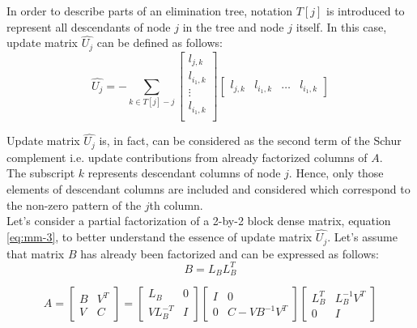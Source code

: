 In order to describe parts of an elimination tree, notation $T[j]$ is introduced to represent all descendants of node $j$ in the tree and node $j$ itself. In this case, update matrix $\hat{U_{j}}$ can be defined as follows:\\

\begin{equation} \label{eq:mm-2}
	\hat{U_{j}} = - \sum_{k \in T[j] -{j}}  \begin{bmatrix}
l_{j,k} \\
l_{i_1,k} \\
\vdots \\
l_{i_1,k} \\
\end{bmatrix} \begin{bmatrix}
l_{j,k} & l_{i_1,k} & \dots & l_{i_1,k}
\end{bmatrix} 
\end{equation}


Update matrix $\hat{U_{j}}$ is, in fact, can be considered as the second term of the Schur complement i.e. update contributions from already factorized columns of $A$.\\

The subscript $k$ represents descendant columns of node $j$. Hence, only those elements of descendant columns are included and considered which correspond to the non-zero pattern of the $j$th column.\\

Let's consider a partial factorization of a 2-by-2 block dense matrix, equation \ref{eq:mm-3}, to better understand the essence of update matrix $\hat{U_{j}}$. Let's assume that  matrix $B$ has already been factorized and can be expressed as follows: \\


\begin{equation} \label{eq:mm-4}
	B = L_{B}L^{T}_{B}
\end{equation}


\begin{equation} \label{eq:mm-3}
A = \begin{bmatrix}
B & V^{T} \\
V & C
\end{bmatrix} 
= 
\begin{bmatrix}
L_{B} & 0 \\
VL^{-T}_{B} & I
\end{bmatrix}
\begin{bmatrix}
I & 0 \\
0 & C - VB^{-1}V^{T}
\end{bmatrix} 
\begin{bmatrix}
L^{T}_{B} & L^{-1}_{B}V^{T} \\
0 & I
\end{bmatrix} 
\end{equation}


